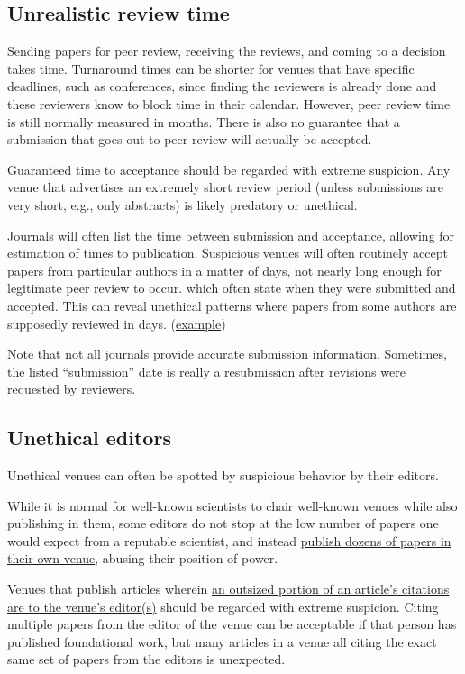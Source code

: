 \documentclass[letterpaper, 12pt]{article}
\begin{document}
\subsection*{Unrealistic review time}

Sending papers for peer review, receiving the reviews, and coming to a decision takes time.
Turnaround times can be shorter for venues that have specific deadlines, such as conferences,
since finding the reviewers is already done and these reviewers know to block time in their calendar.
However, peer review time is still normally measured in months. There is also no guarantee that a submission that goes out to peer review will actually be accepted.

Guaranteed time to acceptance should be regarded with extreme suspicion. Any venue that advertises an extremely short review period (unless submissions are very short, e.g., only abstracts) is likely predatory or unethical.

Journals will often list the time between submission and acceptance, allowing for estimation of times to publication. Suspicious venues will often routinely accept papers from particular authors in a matter of days, not nearly long enough for legitimate peer review to occur.
which often state when they were submitted and accepted.
This can reveal unethical patterns where papers from some authors are supposedly reviewed in days.
(\href{https://deevybee.blogspot.com/2015/02/editors-behaving-badly.html}{example})

Note that not all journals provide accurate submission information. Sometimes, the listed ``submission'' date is really a resubmission after revisions were requested by reviewers.

\subsection*{Unethical editors}

Unethical venues can often be spotted by suspicious behavior by their editors.

While it is normal for well-known scientists to chair well-known venues while also publishing in them,
some editors do not stop at the low number of papers one would expect from a reputable scientist,
and instead \href{https://deevybee.blogspot.com/2020/08/pepiops-prolific-editors-who-publish-in.html}{publish dozens of papers in their own venue}, abusing their position of power.

Venues that publish articles wherein \href{https://pubpeer.com/publications/57BB3F8859A0F5BE6FBC4DB70F2E8E}{an outsized portion of an article's citations are to the venue's editor(s)} should be regarded with extreme suspicion. Citing multiple papers from the editor of the venue
can be acceptable if that person has published foundational work,
but many articles in a venue all citing the exact same set of papers from the editors is unexpected.
\end{document}
